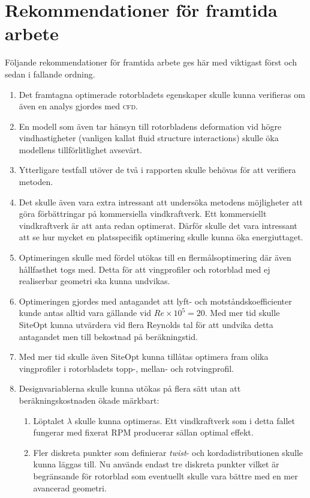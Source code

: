 \pagebreak
\section{Rekommendationer för framtida arbete}

Följande rekommendationer för framtida arbete ges här med viktigast först och sedan i fallande ordning.

\begin{enumerate}
    \item Det framtagna optimerade rotorbladets egenskaper skulle kunna verifieras om även en analys gjordes med \textsc{cfd}.

    \item En modell som även tar hänsyn till rotorbladens deformation vid högre vindhastigheter (vanligen kallat fluid structure interactions) skulle öka modellens tillförlitlighet avsevärt.
    
    \item Ytterligare testfall utöver de två i rapporten skulle behövas för att verifiera metoden. 
  
    \item Det skulle även vara extra intressant att undersöka metodens möjligheter att göra förbättringar på kommersiella vindkraftverk. Ett kommersiellt vindkraftverk är att anta redan optimerat. Därför skulle det vara intressant att se hur mycket en platsspecifik optimering skulle kunna öka energiuttaget.
        
 
    \item Optimeringen skulle med fördel utökas till en flermålsoptimering där även hållfasthet togs med. Detta för att vingprofiler och rotorblad med ej realiserbar geometri ska kunna undvikas.
    
    \item Optimeringen gjordes med antagandet att lyft- och motståndskoefficienter kunde antas alltid vara gällande vid $Re \times 10^5 = 20$. Med mer tid skulle SiteOpt kunna utvärdera vid flera Reynolds tal för att undvika detta antagandet men till bekostnad på beräkningstid.
    
    \item Med mer tid skulle även SiteOpt kunna tillåtas optimera fram olika vingprofiler i rotorbladets topp-, mellan- och rotvingprofil.
    
    \item Designvariablerna skulle kunna utökas på flera sätt utan att beräkningskostnaden ökade märkbart:
    \begin{enumerate}
        \item Löptalet $\lambda$ skulle kunna optimeras. Ett vindkraftverk som i detta fallet fungerar med fixerat RPM producerar sällan optimal effekt.
        \item Fler diskreta punkter som definierar \emph{twist}- och kordadistributionen skulle kunna läggas till. Nu används endast tre diskreta punkter vilket är begränsande för rotorblad som eventuellt skulle vara bättre med en mer avancerad geometri.
    \end{enumerate}
    

\end{enumerate}
